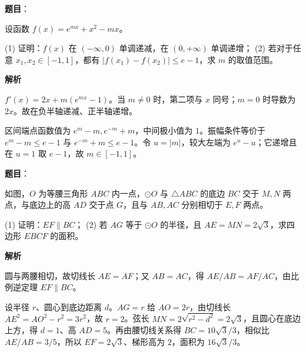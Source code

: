 \begin{answer}

\textbf{题目}：

设函数 $f(x)=e^{mx}+x^2-mx$。

(1) 证明：$f(x)$ 在 $(-\infty,0)$ 单调递减，在 $(0,+\infty)$ 单调递增；  
(2) 若对于任意 $x_1,x_2\in[-1,1]$，都有 $|f(x_1)-f(x_2)|\leqslant e-1$，求 $m$ 的取值范围。

\textbf{解析}


$f'(x)=2x+m(e^{mx}-1)$。当 $m\ne0$ 时，第二项与 $x$ 同号；$m=0$ 时导数为 $2x$。故在负半轴递减、正半轴递增。


区间端点函数值为 $e^m-m,e^{-m}+m$，中间极小值为 $1$。振幅条件等价于 $e^m-m\le e-1$ 与 $e^{-m}+m\le e-1$。令 $u=|m|$，较大左端为 $e^u-u$；它递增且在 $u=1$ 取 $e-1$，故 $m\in[-1,1]$。



\end{answer}
\begin{answer}

\textbf{题目}：

如图，$O$ 为等腰三角形 $ABC$ 内一点，$\odot O$ 与 $\triangle ABC$ 的底边 $BC$ 交于 $M,N$ 两点，与底边上的高 $AD$ 交于点 $G$，且与 $AB,AC$ 分别相切于 $E,F$ 两点。

(1) 证明：$EF\parallel BC$；  
(2) 若 $AG$ 等于 $\odot O$ 的半径，且 $AE=MN=2\sqrt3$，求四边形 $EBCF$ 的面积。
\nopagebreak[4]
\begin{center}\end{center}
\nopagebreak[4]
\textbf{解析}


圆与两腰相切，故切线长 $AE=AF$；又 $AB=AC$，得 $AE/AB=AF/AC$，由比例逆定理 $EF\parallel BC$。


设半径 $r$、圆心到底边距离 $d$。$AG=r$ 给 $AO=2r$，由切线长 $AE^2=AO^2-r^2=3r^2$，故 $r=2$。弦长 $MN=2\sqrt{r^2-d^2}=2\sqrt3$，且圆心在底边上方，得 $d=1$、高 $AD=5$。再由腰切线关系得 $BC=10\sqrt3/3$，相似比 $AE/AB=3/5$，所以 $EF=2\sqrt3$、梯形高为 $2$，面积为 $16\sqrt3/3$。



\end{answer}
